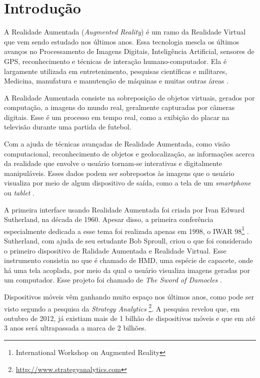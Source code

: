\chapter{Introdução}


A Realidade Aumentada (\textit{Augmented Reality})
é um ramo da Realidade Virtual 
que vem sendo estudado nos últimos anos. Essa tecnologia
mescla os últimos avanços no Processamento de Imagens Digitais,
Inteligência Artificial, sensores de GPS, reconhecimento e
técnicas de interação humano-computador. Ela é largamente utilizada
em entretenimento, pesquisas científicas e militares, Medicina, manufatura e manutenção
de máquinas e muitas outras áreas \cite{ARFeatureMaching, DevActuallyRegistration}.

A Realidade Aumentada consiste na sobreposição de objetos virtuais, gerados por
computação, a imagens do mundo real, geralmente capturadas por câmeras digitais. Esse é
um processo em tempo real, como a exibição do placar na televisão durante uma partida
de futebol. 

Com a ajuda de técnicas avançadas de Realidade Aumentada, como visão computacional,
reconhecimento de objetos e geolocalização, as informações acerca da realidade que envolve o usuário
tornam-se interativas e digitalmente manipuláveis. Esses dados podem ser sobrepostos
às imagens que o usuário visualiza por meio de algum dispositivo de saída, como a tela de um
\textit{smartphone} ou \textit{tablet} \cite{AReX}.


A primeira interface usando Realidade Aumentada foi criada por Ivan Edward Sutherland, na década de 1960. 
Apesar disso, a primeira conferência especialmente dedicada a esse tema foi realizada apenas 
em 1998, o IWAR 98\footnote{International Workshop on Augmented Reality} \cite{TrendsInAR}. 
Sutherland, com ajuda de seu estudante Bob Sproull, criou o que foi considerado o primeiro dispositivo
de Ralidade Aumentada e Realidade Virtual. Esse instrumento consistia no que é chamado de \gls{HMD}, uma
espécie de capacete, onde há uma tela acoplada, por meio da qual o usuário visualiza imagens geradas
por um computador. Esse projeto foi chamado de \textit{The Sword of Damocles} \cite{TheUltimateDisplay}.


Dispositivos móveis vêm ganhando muito espaço nos últimos anos, como pode ser visto segundo a 
pesquisa da \textit{Strategy Analytics}
\footnote{\href{http://www.strategyanalytics.com}{http://www.strategyanalytics.com}}. A pesquisa revelou que,
em outubro de 2012, já existiam mais de 1 bilhão de dispositivos móveis e que em até 3 anos será ultrapassada 
a marca de 2 bilhões. 

